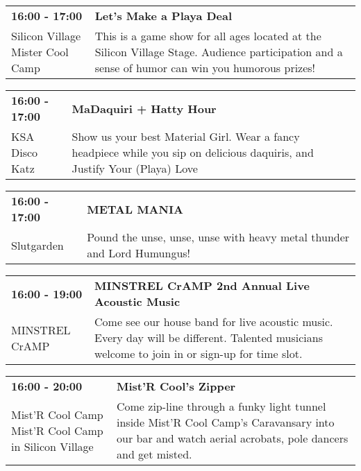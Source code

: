 \begin{tabular}{ p{1in} p{2.2in} }
    \textbf{16:00 - 17:00} & \textbf{Let's Make a Playa Deal} \\
    Silicon Village \newline Mister Cool Camp & This is a game show for all ages located at the Silicon Village Stage. Audience participation and a sense of humor can win you humorous prizes! \\
    \hline 
\end{tabular}
    
\begin{tabular}{ p{1in} p{2.2in} }
    \textbf{16:00 - 17:00} & \textbf{MaDaquiri + Hatty Hour} \\
    KSA Disco Katz \newline  & Show us your best Material Girl. Wear a fancy headpiece while you sip on delicious daquiris, and Justify Your (Playa) Love \\
    \hline 
\end{tabular}
    
\begin{tabular}{ p{1in} p{2.2in} }
    \textbf{16:00 - 17:00} & \textbf{METAL MANIA} \\
    Slutgarden \newline  & Pound the unse, unse, unse with heavy metal thunder and Lord Humungus! \\
    \hline 
\end{tabular}
    
\begin{tabular}{ p{1in} p{2.2in} }
    \textbf{16:00 - 19:00} & \textbf{MINSTREL CrAMP 2nd Annual Live Acoustic Music} \\
    MINSTREL CrAMP \newline  & Come see our house band for live acoustic music.  Every day will be different.  Talented musicians welcome to join in or sign-up for time slot. \\
    \hline 
\end{tabular}
    
\begin{tabular}{ p{1in} p{2.2in} }
    \textbf{16:00 - 20:00} & \textbf{Mist'R Cool's Zipper} \\
    Mist'R Cool Camp \newline Mist'R Cool Camp in Silicon Village & Come zip-line through a funky light tunnel inside Mist'R Cool Camp's Caravansary into our bar and watch aerial acrobats, pole dancers and get misted. \\
    \hline 
\end{tabular}
    
